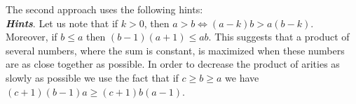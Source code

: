 \documentclass{llncs}
\renewcommand{\paragraph}[1]{\noindent\textit{#1}.}
\begin{document}
\newpage


The second approach uses the following hints:~\\

\paragraph{\textbf{Hints}} Let us note that if $k>0$, then $a>b \iff (a-k)b>a(b-k)$. Moreover, if $b \leq a$ then $(b-1)(a+1) \le ab$. This suggests that
a product of several numbers, where the sum is constant, is maximized when these numbers are as close together as possible.
In order to decrease the product of arities as slowly as possible we 
use the fact that if $c \geq b \geq a$ 
we have
$(c+1)(b-1)a \geq (c+1)b(a-1)$.~\\
\end{document}
